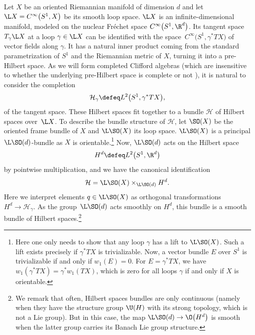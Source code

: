 Let $X$ be an oriented Riemannian manifold of dimension $d$ and let $\L X = C^\infty\big(S^1, X\big)$ be its smooth loop space.
$\L X$ is an infinite-dimensional manifold, modeled on the nuclear Fr\'echet space $C^\infty\big(S^1, \R^d\big)$.
Its tangent space $T_\gamma \L X$ at a loop $\gamma \in \L X$ can be identified with the space~$C^\infty\big(S^1, \gamma^*TX\big)$ of vector fields along $\gamma$.
It has a natural inner product coming from the standard parametrization of $S^1$ and the Riemannian metric of $X$, turning it into a pre-Hilbert space.
As we will form completed Clifford algebras (which are insensitive to whether the underlying pre-Hilbert space is complete or not \cite{PlymenRobinson}), it is natural to consider the completion
\begin{equation*}%
 \mathcal{H}_\gamma \defeq L^2\big(S^1, \gamma^* TX\big),
\end{equation*}
of the tangent space.
These Hilbert spaces fit together to a bundle $\mathcal{H}$ of Hilbert spaces over~$\L X$.
To describe the bundle structure of $\mathcal{H}$, let $\SO(X)$ be the oriented frame bundle of $X$ and $\L \SO(X)$ its loop space.
$\L \SO(X)$ is a principal $\L \SO(d)$-bundle as $X$ is orientable.\footnote{Here one only needs to show that any loop $\gamma$ has a lift to $\L\SO(X)$. Such a lift exists precisely if $\gamma^*TX$ is trivializable.
Now, a vector bundle $E$ over $S^1$ is trivializable if and only if $w_1(E) = 0$. For $E = \gamma^*TX$, we have $w_1(\gamma^*TX) = \gamma^*w_1(TX)$, which is zero for all loops $\gamma$ if and only if $X$ is orientable.}
Now, $\L \SO(d)$ acts on the Hilbert space
\begin{equation}
\label{DefinitionHd}
 H^d \defeq L^2\big(S^1, \R^d\big)
\end{equation}
by pointwise multiplication, and we have the canonical identification
\begin{equation*}
 \mathcal{H} = \L\SO(X) \times_{\L\SO(d)} H^d.
\end{equation*}
Here we interpret elements $q \in \L \SO(X)$ as orthogonal transformations $H^d \to \mathcal{H}_\gamma$.
As the group~$\L\SO(d)$ acts smoothly on $H^d$, this bundle is a smooth bundle of Hilbert spaces.\footnote{We remark that often, Hilbert spaces bundles are only continuous (namely when they have the structure group $\U(H)$ with its strong topology, which is not a Lie group).
But in this case, the map $\L\SO(d) \to \O\big(H^d\big)$ is smooth when the latter group carries its Banach Lie group structure.}

